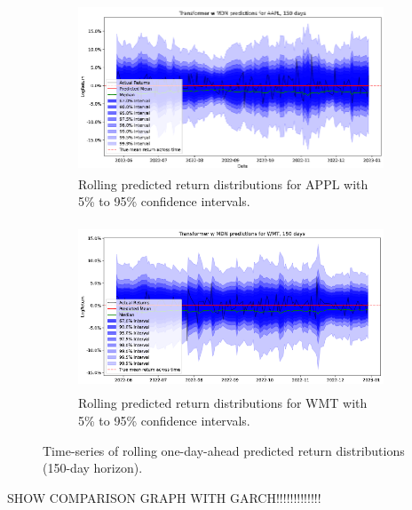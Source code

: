 \begin{figure}[H]
    \centering
    \begin{subfigure}[b]{0.49\textwidth}
        \centering
        \includegraphics[width=\linewidth, height=5cm]{Images/Results/APPL_time_series_example_1.png}
        \caption{Rolling predicted return distributions for APPL with 5\% to 95\% confidence intervals.}
        \label{fig:APPL_time_series_example_150_days}
    \end{subfigure}
    \hfill
    \begin{subfigure}[b]{0.49\textwidth}
        \centering
        \includegraphics[width=\linewidth, height=5cm]{Images/Results/WMT_time_series_example_1.png}
        \caption{Rolling predicted return distributions for WMT with 5\% to 95\% confidence intervals.}
        \label{fig:WMT_time_series_example_150_days}
    \end{subfigure}
    \caption{Time-series of rolling one-day-ahead predicted return distributions (150-day horizon).}
    \label{fig:time_series_roilling_prediction_150_days}
\end{figure}

SHOW COMPARISON GRAPH WITH GARCH!!!!!!!!!!!!!


